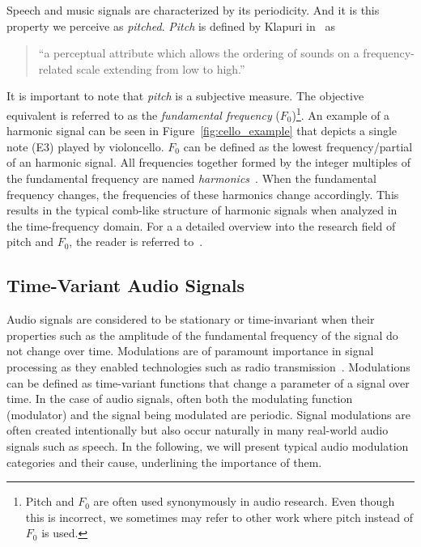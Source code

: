 Speech and music signals are characterized by its periodicity.
And it is this property we perceive as \emph{pitched}.
\emph{Pitch} is defined by Klapuri in~\cite{klapuri06book} as 

\begin{quote}
``a perceptual attribute which allows the ordering of sounds on a frequency-related scale extending from low to high.''
\end{quote}

It is important to note that \emph{pitch} is a subjective measure.
The objective equivalent is referred to as the \emph{fundamental frequency} (\(F_0\))\footnote{Pitch and $F_{0}$ are often used synonymously in audio research. 
Even though this is incorrect, we sometimes may refer to other work where pitch instead of $F_{0}$ is used.}.
An example of a harmonic signal can be seen in Figure~\ref{fig:cello_example} that depicts a single note (E3) played by violoncello.
\(F_{0}\) can be defined as the lowest frequency/partial of an harmonic signal.
All frequencies together formed by the integer multiples of the fundamental frequency are named \textit{harmonics}~\cite{schenker54}.
When the fundamental frequency changes, the frequencies of these harmonics change accordingly.
This results in the typical comb-like structure of harmonic signals when analyzed in the time-frequency domain.
For a a detailed overview into the research field of pitch and \(F_{0}\), the reader is referred to~\cite{klapuri06book}.

\subsection{Time-Variant Audio Signals}\label{sub:time-variant-audio-signals}

Audio signals are considered to be stationary or time-invariant when their properties such as the amplitude of the fundamental frequency of the signal do not change over time.
Modulations are of paramount importance in signal processing as they enabled technologies such as radio transmission~\cite{shannon48}.
Modulations can be defined as time-variant functions that change a parameter of a signal over time.
In the case of audio signals, often both the modulating function (modulator) and the signal being modulated are periodic.
Signal modulations are often created intentionally but also occur naturally in many real-world audio signals such as speech.
In the following, we will present typical audio modulation categories and their cause, underlining the importance of them.

